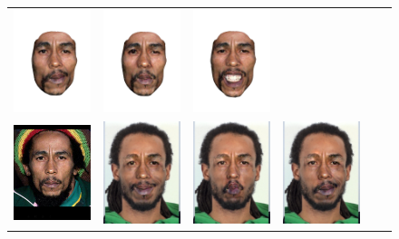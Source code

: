 \begin{figure}
\begin{tabular}{cccccc}
\includegraphics[width=.1535\textwidth]{figures/results/marley_on_tidus_new/light000006.png}&
\includegraphics[width=.1535\textwidth]{figures/results/marley_on_tidus_new/light000008.png}&
\includegraphics[width=.1535\textwidth]{figures/results/marley_on_tidus_new/light000004.png}\\
\includegraphics[width=.1535\textwidth]{figures/results/marley_on_tidus_new/marley-1.png}&
\includegraphics[width=.1535\textwidth]{figures/results/marley_on_tidus_new/v2/composite000002.png}&
\includegraphics[width=.1535\textwidth]{figures/results/marley_on_tidus_new/v2/composite000005.png}&
\includegraphics[width=.1535\textwidth]{figures/results/marley_on_tidus_new/v2/composite000006.png}&

\end{tabular}
\end{figure}
